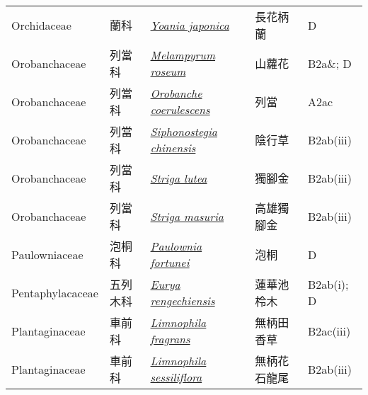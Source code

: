 {\begin{longtable}{p{2.5cm}p{2.5cm}p{4.5cm}p{2.5cm}p{3cm}}
    Orchidaceae & 蘭科 & \href{http://www.theplantlist.org/tpl1.1/search?q=Yoania+japonica}{\textit{Yoania japonica} } & 長花柄蘭 & D \index{Yoania@\textit{Yoania}!japonica@\textit{japonica}}  \index{長花柄蘭} \\
    Orobanchaceae & 列當科 & \href{http://www.theplantlist.org/tpl1.1/search?q=Melampyrum+roseum}{\textit{Melampyrum roseum} } & 山蘿花 & B2a\&; D \index{Melampyrum@\textit{Melampyrum}!roseum@\textit{roseum}}  \index{山蘿花} \\
    Orobanchaceae & 列當科 & \href{http://www.theplantlist.org/tpl1.1/search?q=Orobanche+coerulescens}{\textit{Orobanche coerulescens} } & 列當 & A2ac \index{Orobanche@\textit{Orobanche}!coerulescens@\textit{coerulescens}}  \index{列當} \\
    Orobanchaceae & 列當科 & \href{http://www.theplantlist.org/tpl1.1/search?q=Siphonostegia+chinensis}{\textit{Siphonostegia chinensis} } & 陰行草 & B2ab(iii) \index{Siphonostegia@\textit{Siphonostegia}!chinensis@\textit{chinensis}}  \index{陰行草} \\
    Orobanchaceae & 列當科 & \href{http://www.theplantlist.org/tpl1.1/search?q=Striga+lutea}{\textit{Striga lutea} } & 獨腳金 & B2ab(iii) \index{Striga@\textit{Striga}!lutea@\textit{lutea}}  \index{獨腳金} \\
    Orobanchaceae & 列當科 & \href{http://www.theplantlist.org/tpl1.1/search?q=Striga+masuria}{\textit{Striga masuria} } & 高雄獨腳金 & B2ab(iii) \index{Striga@\textit{Striga}!masuria@\textit{masuria}}  \index{高雄獨腳金} \\
    Paulowniaceae & 泡桐科 & \href{http://www.theplantlist.org/tpl1.1/search?q=Paulownia+fortunei}{\textit{Paulownia fortunei} } & 泡桐 & D \index{Paulownia@\textit{Paulownia}!fortunei@\textit{fortunei}}  \index{泡桐} \\
    Pentaphylacaceae & 五列木科 & \href{http://www.theplantlist.org/tpl1.1/search?q=Eurya+rengechiensis}{\textit{Eurya rengechiensis} } & 蓮華池柃木 & B2ab(i); D \index{Eurya@\textit{Eurya}!rengechiensis@\textit{rengechiensis}}  \index{蓮華池柃木} \\
    Plantaginaceae & 車前科 & \href{http://www.theplantlist.org/tpl1.1/search?q=Limnophila+fragrans}{\textit{Limnophila fragrans} } & 無柄田香草 & B2ac(iii) \index{Limnophila@\textit{Limnophila}!fragrans@\textit{fragrans}}  \index{無柄田香草} \\
    Plantaginaceae & 車前科 & \href{http://www.theplantlist.org/tpl1.1/search?q=Limnophila+sessiliflora}{\textit{Limnophila sessiliflora} } & 無柄花石龍尾 & B2ab(iii) \index{Limnophila@\textit{Limnophila}!sessiliflora@\textit{sessiliflora}}  \index{無柄花石龍尾} \\

\end{longtable}}
